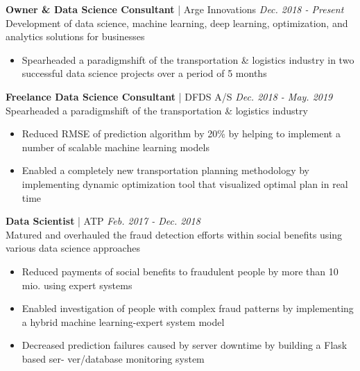 \documentclass[12pt,a4paper]{article}
\newcommand{\textline}[3]{\normalsize{\textbf{#1} | #2 \hfill \textit{#3}}}
\begin{document}
\textline{Owner \& Data Science Consultant}{Arge Innovations}{Dec. 2018 - Present}\\
Development of data science, machine learning, deep learning, optimization, and analytics solutions for businesses
\begin{itemize}[label=\textcolor{myblue}{\textbullet}]
    \vspace{-0.3cm}
    \item Spearheaded a paradigmshift of the transportation \& logistics industry in two successful data science projects over a period of 5 months
\end{itemize}

\textline{Freelance Data Science Consultant}{DFDS A/S}{Dec. 2018 - May. 2019}\\
Spearheaded a paradigmshift of the transportation \& logistics industry
\begin{itemize}[label=\textcolor{myblue}{\textbullet}]
    \vspace{-0.3cm}
    \item Reduced RMSE of prediction algorithm by 20\% by helping to implement a number of scalable machine learning models
    \vspace{-0.3cm}
    \item Enabled a completely new transportation planning methodology by implementing dynamic optimization tool that visualized optimal plan in real time
\end{itemize}

\textline{Data Scientist}{ATP}{Feb. 2017 - Dec. 2018}\\
Matured and overhauled the fraud detection efforts within social benefits using various data science approaches
\begin{itemize}[label=\textcolor{myblue}{\textbullet}]
    \vspace{-0.3cm}
    \item Reduced payments of social benefits to fraudulent people by more than 10 mio. using expert
systems
    \vspace{-0.3cm}
    \item Enabled investigation of people with complex fraud patterns by implementing a hybrid machine
learning-expert system model
    \vspace{-0.3cm}
    \item Decreased prediction failures caused by server downtime by building a Flask based ser-
ver/database monitoring system
\end{itemize}
\end{document}
